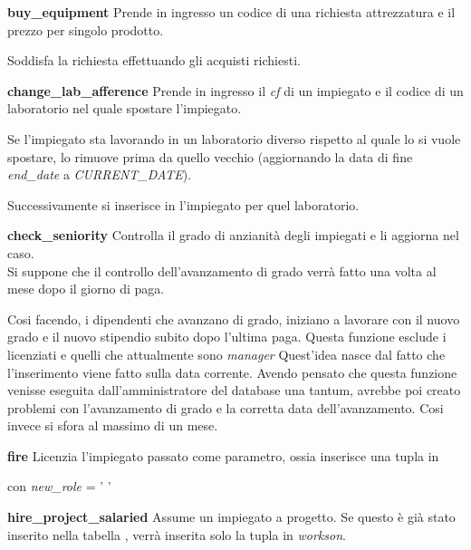\newpage
\noindent \textbf{buy\_equipment}\sskip
Prende in ingresso un codice di una richiesta attrezzatura e il prezzo per singolo prodotto.

Soddisfa la richiesta effettuando gli acquisti richiesti.
\bigskip

\newpage
\noindent \textbf{change\_lab\_afference}\sskip
Prende in ingresso il \textit{cf} di un impiegato e il codice di un laboratorio nel quale spostare l'impiegato.

Se l'impiegato sta lavorando in un laboratorio diverso rispetto al quale lo si vuole spostare, lo rimuove prima da quello vecchio (aggiornando la data di fine \textit{end\_date} a \textit{CURRENT\_DATE}).

Successivamente si inserisce in \textit{\worksat} l'impiegato per quel laboratorio.
\bigskip

\newpage
\noindent \textbf{check\_seniority}\sskip
Controlla il grado di anzianità degli impiegati e li aggiorna nel caso.\\
Si suppone che il controllo dell'avanzamento di grado verrà fatto una volta al mese dopo il giorno di paga.

Cosi facendo, i dipendenti che avanzano di grado, iniziano a lavorare con il nuovo grado e il nuovo stipendio subito dopo l'ultima paga.\sskip
Questa funzione esclude i licenziati e quelli che attualmente sono \textit{manager}\meskip
Quest'idea nasce dal fatto che l'inserimento viene fatto sulla data corrente.
Avendo pensato che questa funzione venisse eseguita dall'amministratore del database una tantum, avrebbe poi creato problemi con l'avanzamento di grado e la corretta data dell'avanzamento.
Cosi invece si sfora al massimo di un mese.
\bigskip

\noindent \textbf{fire}\sskip
Licenzia l'impiegato passato come parametro, ossia inserisce una tupla in

\textit{\careerlog} con \textit{new\_role} = ' '
\bigskip

\newpage
\noindent \textbf{hire\_project\_salaried}\sskip
Assume un impiegato a progetto. Se questo è già stato inserito nella tabella \textit{\projectsalaried}, verrà inserita solo la tupla in \textit{workson}.
\bigskip

